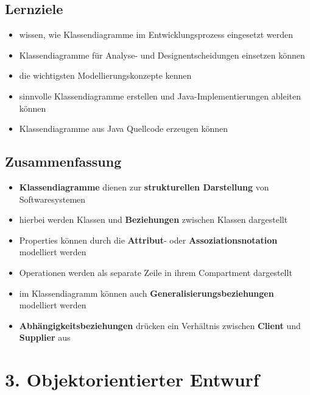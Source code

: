 \subsection*{Lernziele}
\begin{itemize}
    \item wissen, wie Klassendiagramme im Entwicklungsprozess eingesetzt werden
    \item Klassendiagramme für Analyse- und Designentscheidungen einsetzen können
    \item die wichtigsten Modellierungskonzepte kennen
    \item sinnvolle Klassendiagramme erstellen und Java-Implementierungen ableiten können
    \item Klassendiagramme aus Java Quellcode erzeugen können
\end{itemize}

\subsection*{Zusammenfassung}

\begin{itemize}
    \item \textbf{Klassendiagramme} dienen zur \textbf{strukturellen Darstellung} von Softwaresystemen
    \item hierbei werden Klassen und \textbf{Beziehungen} zwischen Klassen dargestellt
    \item Properties können durch die \textbf{Attribut}- oder \textbf{Assoziationsnotation} modelliert werden
    \item Operationen werden als separate Zeile in ihrem Compartment dargestellt
    \item im Klassendiagramm können auch \textbf{Generalisierungsbeziehungen} modelliert werden
    \item \textbf{Abhängigkeitsbeziehungen} drücken ein Verhältnis zwischen \textbf{Client} und \textbf{Supplier} aus
\end{itemize}

\section*{3. Objektorientierter Entwurf}

